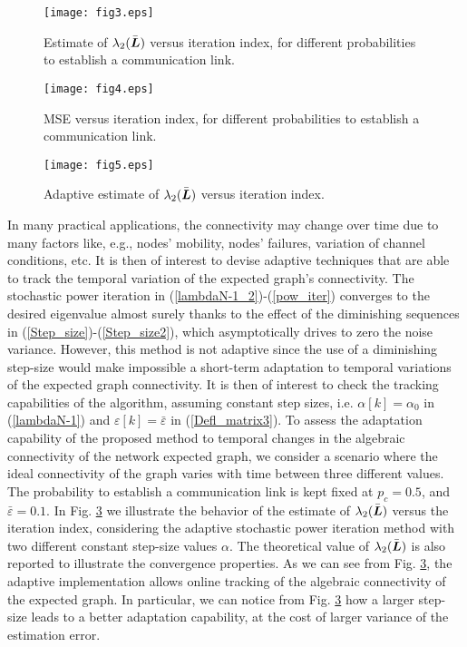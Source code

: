 \documentclass[10pt,twocolumn]{IEEEtran}
\def\bL{\mbox{\boldmath $L$}}
\begin{document}
\begin{figure}[t]
\centering
\texttt{[image: fig3.eps]}
  \caption{Estimate of $\lambda_2(\bar{\bL})$ versus iteration index, for different probabilities to establish a communication link.}\label{lambda2}
\end{figure}

\begin{figure}[t]
\centering
\texttt{[image: fig4.eps]}
  \caption{MSE versus iteration index, for different probabilities to establish a communication link.}\label{MSE_lambda2}
\end{figure}

\begin{figure}[t]
\centering
\texttt{[image: fig5.eps]}
  \caption{Adaptive estimate of $\lambda_2(\bar{\bL})$ versus iteration index.}\label{tracking}
\end{figure}


 In many practical applications, the connectivity may change over time due to many factors like, e.g., nodes' mobility, nodes' failures, variation of channel conditions, etc. It is then of interest to devise adaptive techniques that are able to track the temporal variation of the expected graph's connectivity. The stochastic power iteration in (\ref{lambdaN-1_2})-(\ref{pow_iter}) converges to the desired eigenvalue almost surely thanks to the effect of the diminishing sequences in (\ref{Step_size})-(\ref{Step_size2}), which asymptotically drives to zero the noise variance. However, this method is not adaptive since the use of a diminishing step-size would make impossible a short-term adaptation to temporal variations of the expected graph connectivity. It is then of interest to check the tracking capabilities of the  algorithm, assuming constant step sizes, i.e. $\alpha[k]=\alpha_0$ in (\ref{lambdaN-1}) and $\varepsilon[k]=\bar{\varepsilon}$ in (\ref{Defl_matrix3}). To assess the adaptation capability of the proposed method to temporal changes in the algebraic connectivity of the network expected graph, we consider a scenario where the ideal connectivity of the graph varies with time between three different values. The probability to establish a communication link is kept fixed at $p_c=0.5$, and $\bar{\varepsilon}=0.1$. In Fig. \ref{tracking} we illustrate the behavior of the estimate of $\lambda_2(\bar{\bL})$ versus the iteration index, considering the adaptive stochastic power iteration method with two different constant step-size values $\alpha$. The theoretical value of $\lambda_2(\bar{\bL})$ is also reported to illustrate the convergence properties. As we can see from Fig. \ref{tracking}, the adaptive implementation allows online tracking of the algebraic connectivity of the expected graph. In particular, we can notice from Fig. \ref{tracking} how a larger step-size leads to a better adaptation capability, at the cost of larger variance of the estimation error.
\end{document}
